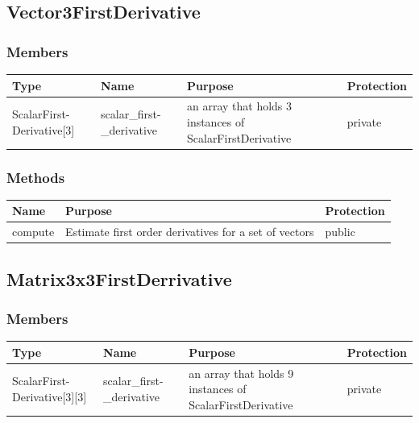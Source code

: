 \documentclass{report}
\begin{document}
\subsection{Vector3FirstDerivative}
\subsubsection{Members}
\begin{center}
\begin{longtable}{|p{2.75cm}|p{2.8cm}|p{7.1cm}|l|} \hline
\textbf{Type} & \textbf{Name} & \textbf{Purpose} & \textbf{Protection} \\
\hline
\endhead
ScalarFirst-\newline Derivative[3] & scalar\_first-\newline\_derivative & an array that holds 3 instances of ScalarFirstDerivative & private \\ 
\hline
\end{longtable}
\end{center}

\subsubsection{Methods}
\begin{center}
\begin{longtable}{|p{3cm}|p{10cm}|l|} \hline
\textbf{Name} & \textbf{Purpose} & \textbf{Protection} \\
\hline
\endhead
compute & Estimate first order derivatives for a set of vectors & public \\
\hline    
\end{longtable}
\end{center}

\subsection{Matrix3x3FirstDerrivative}
\subsubsection{Members}
\begin{center}
\begin{longtable}{|p{2.75cm}|p{2.8cm}|p{7.1cm}|l|} \hline
\textbf{Type} & \textbf{Name} & \textbf{Purpose} & \textbf{Protection} \\
\hline
\endhead
ScalarFirst-\newline Derivative[3][3] & scalar\_first-\newline\_derivative & an array that holds 9 instances of ScalarFirstDerivative & private \\ 
\hline
\end{longtable}
\end{center}
\end{document}
